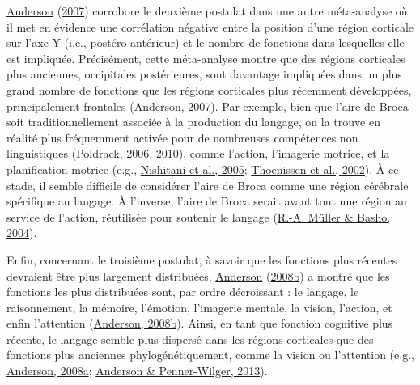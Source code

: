 \documentclass[
  a4paper,12pt,twoside,onecolumn,openright,final,oldfontcommands]{memoir}
\begin{document}
\protect\hyperlink{ref-anderson_evolution_2007}{Anderson} (\protect\hyperlink{ref-anderson_evolution_2007}{2007}) corrobore le deuxième postulat dans une autre méta-analyse où il met en évidence une corrélation négative entre la position d'une région corticale sur l'axe Y (i.e., postéro-antérieur) et le nombre de fonctions dans lesquelles elle est impliquée. Précisément, cette méta-analyse montre que des régions corticales plus anciennes, occipitales postérieures, sont davantage impliquées dans un plus grand nombre de fonctions que les régions corticales plus récemment développées, principalement frontales (\protect\hyperlink{ref-anderson_evolution_2007}{Anderson, 2007}). Par exemple, bien que l'aire de Broca soit traditionnellement associée à la production du langage, on la trouve en réalité plus fréquemment activée pour de nombreuses compétences non linguistiques (\protect\hyperlink{ref-poldrack_can_2006}{Poldrack, 2006}, \protect\hyperlink{ref-poldrack_mapping_2010}{2010}), comme l'action, l'imagerie motrice, et la planification motrice (e.g., \protect\hyperlink{ref-nishitani_brocas_2005}{Nishitani et al., 2005}; \protect\hyperlink{ref-thoenissen_differential_2002}{Thoenissen et al., 2002}). À ce stade, il semble difficile de considérer l'aire de Broca comme une région cérébrale spécifique au langage. À l'inverse, l'aire de Broca serait avant tout une région au service de l'action, réutilisée pour soutenir le langage (\protect\hyperlink{ref-muller_are_2004}{R.-A. Müller \& Basho, 2004}).

Enfin, concernant le troisième postulat, à savoir que les fonctions plus récentes devraient être plus largement distribuées, \protect\hyperlink{ref-anderson_grounds_2008}{Anderson} (\protect\hyperlink{ref-anderson_grounds_2008}{2008b}) a montré que les fonctions les plus distribuées sont, par ordre décroissant : le langage, le raisonnement, la mémoire, l'émotion, l'imagerie mentale, la vision, l'action, et enfin l'attention (\protect\hyperlink{ref-anderson_grounds_2008}{Anderson, 2008b}). Ainsi, en tant que fonction cognitive plus récente, le langage semble plus dispersé dans les régions corticales que des fonctions plus anciennes phylogénétiquement, comme la vision ou l'attention (e.g., \protect\hyperlink{ref-anderson_circuit_2008}{Anderson, 2008a}; \protect\hyperlink{ref-anderson_neural_2013}{Anderson \& Penner-Wilger, 2013}).
\end{document}
